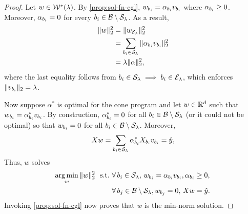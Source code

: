 \minNormProgram*
\begin{proof}
    Let \( w \in \mathcal{W}^*(\lambda) \).
    By \cref{prop:sol-fn-cgl}, \( w_{b_i} = \alpha_{b_i} v_{b_i} \)
    where \( \alpha_{b_i} \geq 0 \).
    Moreover, \( \alpha_{b_i} = 0 \) for every
    \( {b_i} \in \mathcal{B} \setminus \mathcal{S}_\lambda \).
    As a result,
    \begin{align*}
        \|w\|^2_2
         & = \|w_{\mathcal{E}_{\lambda}}\|^2_2                                         \\
         & = \sum_{{b_i} \in \mathcal{S}_\lambda} \|\alpha_{b_i} v_{b_i}\|^2_2 \\
         & = \lambda \|\alpha\|_2^2,
    \end{align*}
    where the last equality follows from \( {b_i} \in \mathcal{S}_\lambda \implies {b_i} \in {\mathcal{E}_{\lambda}} \),
    which enforces \( \|v_{b_i}\|_2 = \lambda \).

    Now suppose \( \alpha^* \) is optimal for the cone program
    and let \( w \in \mathbb{R}^d \) such that \( w_{b_i} = \alpha_{b_i}^* v_{b_i} \).
    By construction, \( \alpha^*_{b_i} = 0 \)
    for all \( {b_i} \in \mathcal{B} \setminus \mathcal{S}_\lambda \)
    (or it could not be optimal)
    so that \( w_{b_i} = 0 \) for all \( {b_i} \in \mathcal{B} \setminus \mathcal{S}_\lambda \).
    Moreover,
    \[
        X w = \sum_{{b_i} \in \mathcal{S}_\lambda} \alpha_{b_i}^* X_{b_i} v_{b_i} = \hat y,
    \]
    Thus, \( w \) solves
    \[
        \begin{aligned}
            \mathop{\rm arg\,min}_{w} \|w\|_2^2
            \, \, \text{ s.t.} \, \,
             & \forall \, {b_i} \in \mathcal{S}_\lambda, \, w_{b_i} = \alpha_{b_i} v_{b_i}, \alpha_{b_i} \geq 0, \, \\
             & \forall \, b_j \in \mathcal{B} \setminus \mathcal{S}_\lambda, w_{b_j} = 0, \,
            X w = \hat y.
        \end{aligned}
    \]
    Invoking \cref{prop:sol-fn-cgl} now proves that \( w \) is the min-norm solution.
\end{proof}

